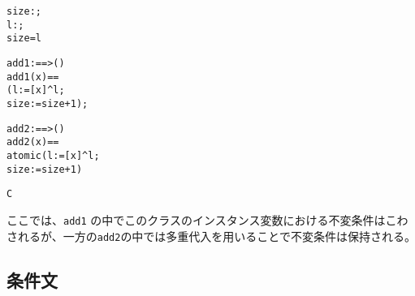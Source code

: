 \documentclass[\pformat,12pt]{jarticle}
\begin{document}
\begin{description}
\begin{alltt}
      size : ;
      l : ;
     size =  l

      add1 :  ==> ()
      add1 (x) ==
         ( l := [x] ^ l;
           size := size + 1);

      add2 :  ==> ()
      add2 (x) ==
         atomic (l := [x] ^ l;
                 size := size + 1)

   C
  \end{alltt}
ここでは、\texttt{add1} の中でこのクラスのインスタンス変数における不変条件はこわされるが、一方の\texttt{add2}の中では多重代入を用いることで不変条件は保持される。

\end{description}

\subsection{条件文}\label{condstmt}
\end{document}
